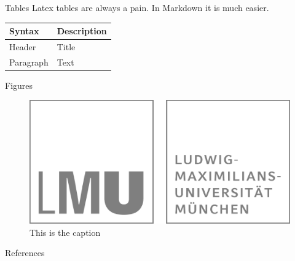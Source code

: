 \documentclass[
  fleqn,compress,utf8,aspectratio=169,t,
]{beamer}
\newif\ifbibliography
\begin{document}
\begin{frame}{Tables}
\protect\hypertarget{tables}{}
Latex tables are always a pain. In Markdown it is much easier.

\begin{longtable}[]{@{}ll@{}}
\toprule
Syntax & Description\tabularnewline
\midrule
\endhead
Header & Title\tabularnewline
Paragraph & Text\tabularnewline
\bottomrule
\end{longtable}
\end{frame}

\begin{frame}{Figures}
\protect\hypertarget{figures}{}
\begin{figure}
\centering
\includegraphics{../lmulogo.pdf}
\caption{This is the caption}
\end{figure}
\end{frame}

\begin{frame}[allowframebreaks]{References}
  \bibliographytrue
  \nocite{*}
  \printbibliography[heading=none]
\end{frame}
\end{document}
